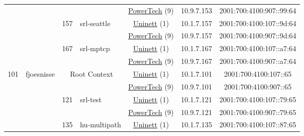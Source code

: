 \begin{small}
\begin{center}
\begin{longtable}{|c|c|c|c|c|c|c|c|}
  &  &  &  & \multicolumn{2}{|c|}{\tiny{\href{http://www.powertech.no}{PowerTech} (9)}} & \tiny{10.9.7.153} & \tiny{2001:700:4100:907::99:64} \\* \cline{3-3}\cline{4-4}\cline{5-5}\cline{6-6}\cline{7-7}\cline{8-8}
  &  & \multirow{2}{*}{\tiny{157}} & \multicolumn{1}{|l|}{\multirow{2}{*}{\tiny{srl-seattle}}} & \multicolumn{2}{|c|}{\tiny{\href{https://www.uninett.no}{Uninett} (1)}} & \tiny{10.1.7.157} & \tiny{2001:700:4100:107::9d:64} \\* \cline{5-5}\cline{6-6}\cline{7-7}\cline{8-8}
  &  &  &  & \multicolumn{2}{|c|}{\tiny{\href{http://www.powertech.no}{PowerTech} (9)}} & \tiny{10.9.7.157} & \tiny{2001:700:4100:907::9d:64} \\* \cline{3-3}\cline{4-4}\cline{5-5}\cline{6-6}\cline{7-7}\cline{8-8}
  &  & \multirow{2}{*}{\tiny{167}} & \multicolumn{1}{|l|}{\multirow{2}{*}{\tiny{srl-mptcp}}} & \multicolumn{2}{|c|}{\tiny{\href{https://www.uninett.no}{Uninett} (1)}} & \tiny{10.1.7.167} & \tiny{2001:700:4100:107::a7:64} \\* \cline{5-5}\cline{6-6}\cline{7-7}\cline{8-8}
  &  &  &  & \multicolumn{2}{|c|}{\tiny{\href{http://www.powertech.no}{PowerTech} (9)}} & \tiny{10.9.7.167} & \tiny{2001:700:4100:907::a7:64} \\ \hline
 \multirow{16}{*}{\tiny{101}} & \multicolumn{1}{|l|}{\multirow{16}{*}{\tiny{fjoesnisse}}} & \multicolumn{2}{|c|}{\multirow{2}{*}{\tiny{Root Context}}} & \multicolumn{2}{|c|}{\tiny{\href{https://www.uninett.no}{Uninett} (1)}} & \tiny{10.1.7.101} & \tiny{2001:700:4100:107::65} \\* \cline{5-5}\cline{6-6}\cline{7-7}\cline{8-8}
  &  & \multicolumn{2}{|c|}{} & \multicolumn{2}{|c|}{\tiny{\href{http://www.powertech.no}{PowerTech} (9)}} & \tiny{10.9.7.101} & \tiny{2001:700:4100:907::65} \\* \cline{3-3}\cline{4-4}\cline{5-5}\cline{6-6}\cline{7-7}\cline{8-8}
  &  & \multirow{2}{*}{\tiny{121}} & \multicolumn{1}{|l|}{\multirow{2}{*}{\tiny{srl-test}}} & \multicolumn{2}{|c|}{\tiny{\href{https://www.uninett.no}{Uninett} (1)}} & \tiny{10.1.7.121} & \tiny{2001:700:4100:107::79:65} \\* \cline{5-5}\cline{6-6}\cline{7-7}\cline{8-8}
  &  &  &  & \multicolumn{2}{|c|}{\tiny{\href{http://www.powertech.no}{PowerTech} (9)}} & \tiny{10.9.7.121} & \tiny{2001:700:4100:907::79:65} \\* \cline{3-3}\cline{4-4}\cline{5-5}\cline{6-6}\cline{7-7}\cline{8-8}
  &  & \multirow{2}{*}{\tiny{135}} & \multicolumn{1}{|l|}{\multirow{2}{*}{\tiny{hu-multipath}}} & \multicolumn{2}{|c|}{\tiny{\href{https://www.uninett.no}{Uninett} (1)}} & \tiny{10.1.7.135} & \tiny{2001:700:4100:107::87:65} \\* \cline{5-5}\cline{6-6}\cline{7-7}\cline{8-8}

\end{longtable}
\end{center}
\end{small}
